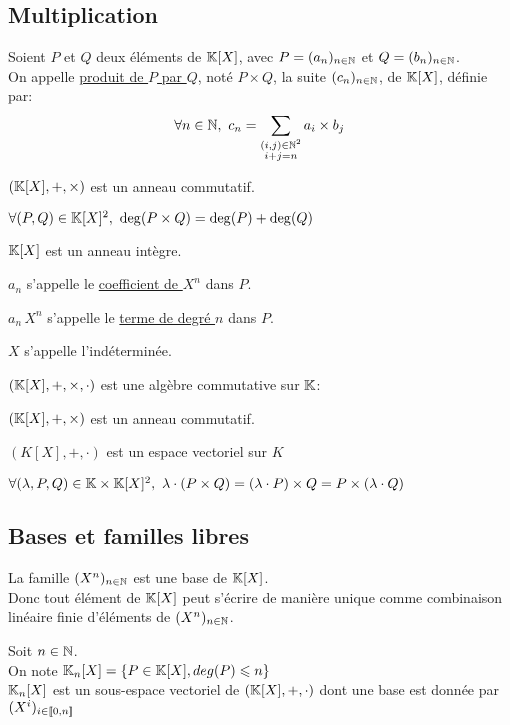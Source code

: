 \documentclass[12pt,twoside,a4paper]{article}
\begin{document}
		\subsection{Multiplication}
			\begin{defi}
				Soient $P$ et $Q$ deux éléments de $\mathbb{K}[X]$, avec $P=(a_n)_{n\in\mathbb{N}}$ et $Q=(b_n)_{n\in\mathbb{N}}$.\\
				On appelle \underline{produit de $P$ par $Q$}, noté $P\times Q$, la suite $(c_n)_{n\in\mathbb{N}}$, de $\mathbb{K}[X]$, définie par:
				$$\forall n\in\N,\ c_n=\sum\limits_{\substack{(i,j)\in\N^{2}\\i+j=n}}a_i\times b_j$$
			\end{defi}
			\begin{prop}
				$(\mathbb{K}[X],+,\times)$ est un anneau commutatif.
			\end{prop}
			\begin{prop}
				$\forall (P,Q)\in\mathbb{K}[X]^{2},\ \deg(P\times Q)=\deg(P)+\deg(Q)$
			\end{prop}
			\begin{coro}
				$\mathbb{K}[X]$ est un anneau intègre.
			\end{coro}
			\begin{defi}
				\begin{liste}
					\item $a_n$ s'appelle le \underline{coefficient de $X^{n}$} dans $P$.
					\item $a_n\,X^{n}$ s'appelle le \underline{terme de degré $n$} dans $P$.
					\item $X$ s'appelle l'indéterminée.
				\end{liste}
			\end{defi}
			\begin{prop}
				$(\mathbb{K}[X],+,\times,\cdot)$ est une algèbre commutative sur $\mathbb{K}$:
				\begin{liste}
					\item $(\mathbb{K}[X],+,\times)$ est un anneau commutatif.
					\item $(K[X],+,\cdot)$ est un espace vectoriel sur $K$
					\item $\forall(\lambda,P,Q)\in\mathbb{K}\times \mathbb{K}[X]^{2},\ \lambda\cdot(P\times Q)=(\lambda\cdot P)\times Q=P\times(\lambda\cdot Q)$
				\end{liste}
			\end{prop}
		\subsection{Bases et familles libres}
			\begin{prop}
				La famille $(X^{n})_{n\in\mathbb{N}}$ est une base de $\mathbb{K}[X]$.\\
				Donc tout élément de $\mathbb{K}[X]$ peut s'écrire de manière unique comme combinaison linéaire finie d'éléments de $(X^{n})_{n\in\mathbb{N}}$.
			\end{prop}
			\begin{prop}
				Soit $n\in\mathbb{N}$.\\
				On note $\mathbb{K}_n[X]=\left\lbrace P\in\mathbb{K}[X],deg(P)\leqslant n\right\rbrace$\\
				$\mathbb{K}_n[X]$ est un sous-espace vectoriel de $(\mathbb{K}[X],+,\cdot)$ dont une base est donnée par $(X^{i})_{i\in[\![0,n]\!]}$
			\end{prop}
\end{document}
